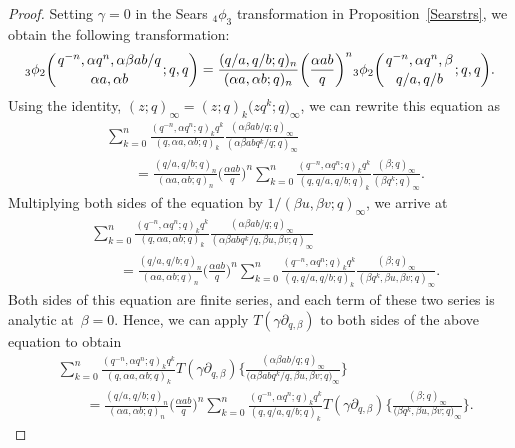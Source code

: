 \documentclass[10pt,a4paper]{amsart}
\numberwithin{equation}{section}
\begin{document}
\begin{proof}
Setting $\gamma=0$ in the Sears $_4\phi_3$ transformation in Proposition~\ref{Searstrs}, we obtain the following transformation:
\begin{align*}
{_3 \phi_2} \biggl({{q^{-n}, \alpha q^n, \alpha \beta ab/q}
\atop{\alpha a, \alpha b}}; q, q\biggr)
=\frac{(q/a, q/b; q)_n}{(\alpha a, \alpha b; q)_n}
\biggl(\frac{\alpha ab}{q}\biggr)^n
{_3 \phi_2} \biggl({{q^{-n}, \alpha q^n, \beta}
\atop{q/a, q/b}}; q, q\biggr).
\end{align*}
Using the identity, $(z; q)_\infty=(z; q)_k \bigl(zq^k; q\bigr)_\infty$, we can rewrite this equation as
\begin{align*}
&\sum_{k=0}^{n} \frac{(q^{-n}, \alpha q^n; q)_k q^k}{(q, \alpha a, \alpha b; q)_k}
\frac{(\alpha \beta ab/q; q)_\infty}{(\alpha \beta ab q^k/q; q)_\infty} \\
&\qquad{}=\frac{(q/a, q/b; q)_n}{(\alpha a, \alpha b; q)_n}
\biggl(\frac{\alpha ab}{q}\biggr)^n
\sum_{k=0}^{n} \frac{(q^{-n}, \alpha q^n; q)_k q^k}{(q, q/a, q/b; q)_k}
\frac{(\beta; q)_\infty}{(\beta q^k; q)_\infty}.
\end{align*}
Multiplying both sides of the equation by $1/(\beta u, \beta v; q)_\infty$, we arrive at
\begin{align*}
&\sum_{k=0}^{n} \frac{(q^{-n}, \alpha q^n; q)_k q^k}{(q, \alpha a, \alpha b; q)_k}
\frac{(\alpha \beta ab/q; q)_\infty}{(\alpha \beta ab q^k/q, \beta u, \beta v; q)_\infty} \\
&\qquad{}=\frac{(q/a, q/b; q)_n}{(\alpha a, \alpha b; q)_n}
\biggl(\frac{\alpha ab}{q}\biggr)^n
\sum_{k=0}^{n} \frac{(q^{-n}, \alpha q^n; q)_k q^k}{(q, q/a, q/b; q)_k}
\frac{(\beta; q)_\infty}{(\beta q^k, \beta u, \beta v; q)_\infty}.
\end{align*}
Both sides of this equation are finite series, and each term of these two series is analytic at~${\beta=0}$.
Hence, we can apply $T(\gamma \partial_{q, \beta})$ to both sides of the above equation
to obtain
\begin{align}
&\sum_{k=0}^{n} \frac{(q^{-n}, \alpha q^n; q)_k q^k}{(q, \alpha a, \alpha b; q)_k}
T(\gamma \partial_{q, \beta}) \biggl\{\frac{(\alpha \beta ab/q; q)_\infty}{\bigl(\alpha \beta ab q^k/q, \beta u, \beta v; q\bigr)_\infty} \biggr\}\nonumber\\
&\qquad{}=\frac{(q/a, q/b; q)_n}{(\alpha a, \alpha b; q)_n}
\biggl(\frac{\alpha ab}{q}\biggr)^n \sum_{k=0}^{n} \frac{(q^{-n}, \alpha q^n; q)_k q^k}{(q, q/a, q/b; q)_k}
T(\gamma \partial_{q, \beta})\biggl\{\frac{(\beta; q)_\infty}{\bigl(\beta q^k, \beta u, \beta v; q\bigr)_\infty}\biggr\}.

\end{align}
\end{proof}
\end{document}

